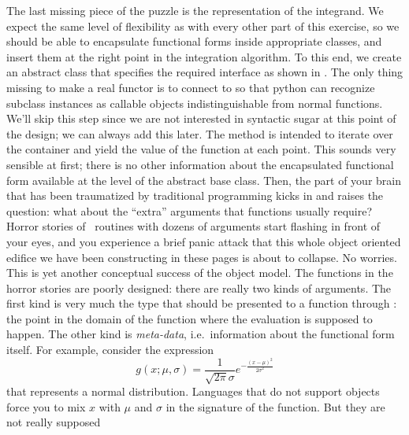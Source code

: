The last missing piece of the puzzle is the representation of the integrand. We expect the same
level of flexibility as with every other part of this exercise, so we should be able to
encapsulate functional forms inside appropriate classes, and insert them at the right point in
the integration algorithm. To this end, we create an abstract class  that
specifies the required interface as shown in . The only thing
missing to make  a real functor\supercite{c++-idioms} is to connect  to
 so that python can recognize subclass instances as callable objects
indistinguishable from normal functions. We'll skip this step since we are not interested in
syntactic sugar at this point of the design; we can always add this later.
%
%
The method  is intended to iterate over the container  and
yield the value of the function at each point. This sounds very sensible at first; there is no
other information about the encapsulated functional form available at the level of the
abstract base class. Then, the part of your brain that has been traumatized by traditional
programming kicks in and raises the question: what about the ``extra'' arguments that functions
usually require? Horror stories of \fortran\ routines with dozens of arguments start flashing
in front of your eyes, and you experience a brief panic attack that this whole object oriented
edifice we have been constructing in these pages is about to collapse. No worries. This is yet
another conceptual success of the object model. The functions in the horror stories are poorly
designed: there are really two kinds of arguments. The first kind is very much the type that
should be presented to a function through : the point in the domain of the
function where the evaluation is supposed to happen. The other kind is {\em meta-data},
i.e.~information about the functional form itself. For example, consider the expression
\begin{equation}
  g(x; \mu,\sigma) = \frac{1}{\sqrt{2\pi} \sigma} e^{-\frac{(x-\mu)^2}{2\sigma^2}}
\label{eq:gaussian}
\end{equation}
that represents a normal distribution. Languages that do not support objects force you to mix
$x$ with $\mu$ and $\sigma$ in the signature of the function. But they are not really supposed
